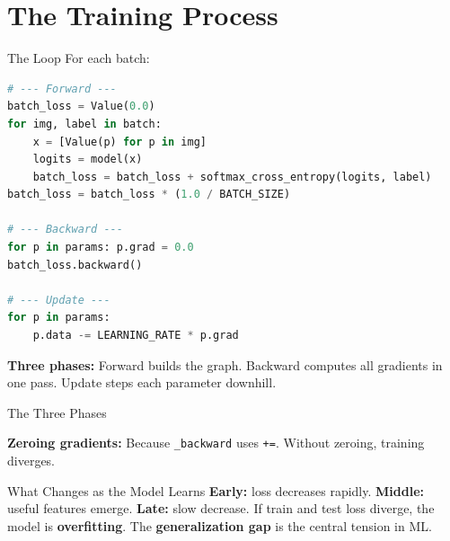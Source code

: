 \documentclass[10pt]{beamer}
\begin{document}
\section{The Training Process}

\begin{frame}{The Loop}
    For each batch:
    \begin{lstlisting}[language=Python, caption={Complete training step}]
# --- Forward ---
batch_loss = Value(0.0)
for img, label in batch:
    x = [Value(p) for p in img]
    logits = model(x)
    batch_loss = batch_loss + softmax_cross_entropy(logits, label)
batch_loss = batch_loss * (1.0 / BATCH_SIZE)

# --- Backward ---
for p in params: p.grad = 0.0
batch_loss.backward()

# --- Update ---
for p in params:
    p.data -= LEARNING_RATE * p.grad
    \end{lstlisting}
    \textbf{Three phases:} Forward builds the graph. Backward computes all gradients in one pass. Update steps each parameter downhill.
\end{frame}

\begin{frame}{The Three Phases}
    \vspace{0.5cm}
    \textbf{Zeroing gradients:} Because \texttt{\_backward} uses \texttt{+=}. Without zeroing, training diverges.
\end{frame}

\begin{frame}{What Changes as the Model Learns}
    \textbf{Early:} loss decreases rapidly. \textbf{Middle:} useful features emerge. \textbf{Late:} slow decrease.
    \vspace{0.3cm}
    If train and test loss diverge, the model is \textbf{overfitting}. The \textbf{generalization gap} is the central tension in ML.
\end{frame}
\end{document}
